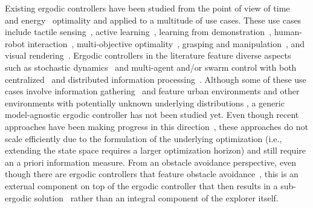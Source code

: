 \documentclass[letterpaper, 10 pt, conference, twoside]{IEEEtran}
\theoremstyle{definition}
\begin{document}
Existing ergodic controllers have been studied from the point of view of time~\cite{dong2023time} and energy~\cite{seewald2024energy,naveed2024eclares} optimality and applied to a multitude of use cases. These use cases include tactile sensing~\cite{abraham2017ergodic}, active learning~\cite{abraham2021ergodic}, learning from demonstration~\cite{kalinowska2021learning}, human-robot interaction~\cite{fitzsimons2019ergodicity,fitzsimons2022ergodic}, multi-objective optimality~\cite{ren2023pareto,srinivasan2023multi}, grasping and manipulation~\cite{shetty2022ergodic,bilaloglu2023whole}, and visual rendering~\cite{low2022drozbot,prabhakar2020autonomous}. Ergodic controllers in the literature feature diverse aspects such as stochastic dynamics~\cite{torre2016ergodic,ayvali2017ergodic} and multi-agent and/or swarm control with both centralized~\cite{seewald2024energy,rao2024learning} and distributed information processing~\cite{prabhakar2020ergodic,coffin2022multi}. Although some of these use cases involve information gathering~\cite{dressel2018optimality} and feature urban environments and other 
environments with potentially unknown underlying distributions %
\cite{prabhakar2020ergodic,rao2023multi}, a generic model-agnostic ergodic controller has not been studied yet. Even though recent approaches have been making progress in this direction~\cite{whittemeyer2023bi,seewald2024energy,naveed2024eclares,dong2023time,ivic2022constrained}, these approaches do not scale efficiently due to the formulation of the underlying optimization (i.e., extending the state space requires a larger optimization horizon) and still require an a priori information measure. From an obstacle avoidance perspective, even though there are ergodic controllers that feature obstacle avoidance~\cite{lerch2023safety,prabhakar2020ergodic}, this is an external component on top of the ergodic controller that then results in a sub-ergodic solution~\cite{dong2023time} rather than an integral component of the explorer itself.
\end{document}
